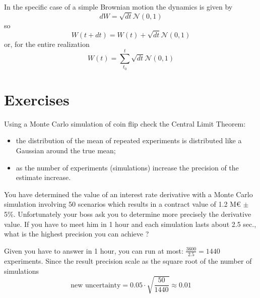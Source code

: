 \documentclass[12pt,a4paper]{book}
\begin{document}
In the specific case of a simple Brownian motion the dynamics is given by
\begin{equation}
dW = \sqrt{dt}\mathcal{N}(0,1)
\end{equation}
so
\begin{equation}
W(t+dt) = W(t) + \sqrt{dt}\mathcal{N}(0,1)
\end{equation}
or, for the entire realization
\begin{equation}
W(t) = \sum_{t_0}^{t} \sqrt{dt}\mathcal{N}(0,1)
\end{equation}

\section*{Exercises}
\begin{exercise}[subtitle={Central Limit Theorem  (\texttt{python})}]
Using a Monte Carlo simulation of coin flip check the Central Limit Theorem:
\begin{itemize}
\item the distribution of the mean of repeated experiments is distributed like a Gaussian around the true mean;
\item as the number of experiments (simulations) increase the precision of the estimate increase.
\end{itemize}
\end{exercise}

\begin{exercise}[subtitle={Monte Carlo}]
You have determined the value of an interest rate derivative with a Monte Carlo simulation involving 50 scenarios which results in a contract value of 1.2 M€ $\pm$ 5\%. Unfortunately your boss ask you to determine more precisely the derivative value. If you have to meet him in 1 hour and each simulation lasts about 2.5 sec., what is the highest precision you can achieve ?
\end{exercise}
\begin{solution}
Given you have to answer in 1 hour, you can run at most: $\frac{3600}{2.5}=1440$ experiments. Since the result precision scale as the square root of the number of simulations
\begin{equation*}
\textrm{new uncertainty} = 0.05 \cdot \sqrt{\frac{50}{1440}} \approx 0.01
\end{equation*}
\end{solution}
\end{document}
